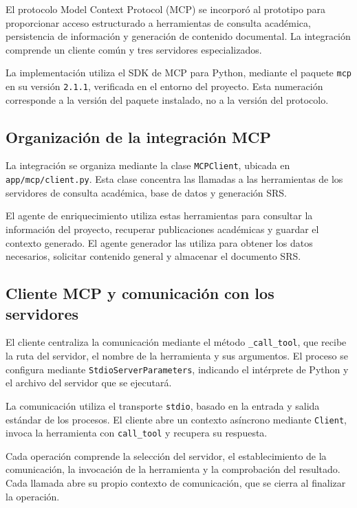 El protocolo Model Context Protocol (MCP) se incorporó
al prototipo para proporcionar acceso estructurado a
herramientas de consulta académica, persistencia de
información y generación de contenido documental.
La integración comprende un cliente común y tres
servidores especializados.

La implementación utiliza el SDK de MCP para Python,
mediante el paquete \texttt{mcp} en su versión
\texttt{2.1.1}, verificada en el entorno del proyecto.
Esta numeración corresponde a la versión del paquete
instalado, no a la versión del protocolo.

\subsection{Organización de la integración MCP}

La integración se organiza mediante la clase
\texttt{MCPClient}, ubicada en
\texttt{app/mcp/client.py}. Esta clase concentra
las llamadas a las herramientas de los servidores
de consulta académica, base de datos y generación SRS.

El agente de enriquecimiento utiliza estas herramientas
para consultar la información del proyecto, recuperar
publicaciones académicas y guardar el contexto generado.
El agente generador las utiliza para obtener los datos
necesarios, solicitar contenido general y almacenar
el documento SRS.

\subsection{Cliente MCP y comunicación con los servidores}

El cliente centraliza la comunicación mediante el método
\texttt{\_call\_tool}, que recibe la ruta del servidor,
el nombre de la herramienta y sus argumentos.
El proceso se configura mediante
\texttt{StdioServerParameters}, indicando el intérprete
de Python y el archivo del servidor que se ejecutará.

La comunicación utiliza el transporte \texttt{stdio},
basado en la entrada y salida estándar de los procesos.
El cliente abre un contexto asíncrono mediante
\texttt{Client}, invoca la herramienta con
\texttt{call\_tool} y recupera su respuesta.

Cada operación comprende la selección del servidor,
el establecimiento de la comunicación, la invocación
de la herramienta y la comprobación del resultado.
Cada llamada abre su propio contexto de comunicación,
que se cierra al finalizar la operación.

